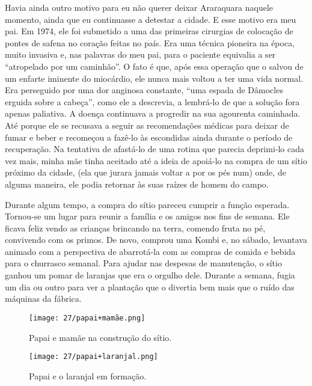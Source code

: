 Havia ainda outro motivo para eu não querer deixar Araraquara naquele momento, ainda que eu continuasse a detestar a cidade.
E esse motivo era  meu pai.
Em 1974, ele foi submetido a uma das primeiras cirurgias de colocação de pontes de safena no coração feitas no país.
Era uma técnica pioneira na época, muito invasiva e, nas palavras do meu pai, para o paciente equivalia a ser “atropelado por um caminhão”.
O fato é que, após essa operação que o salvou de um enfarte iminente do miocárdio, ele nunca mais voltou a ter uma vida normal.
Era perseguido por uma dor anginosa constante, “uma espada de Dâmocles erguida sobre a cabeça”, como ele a descrevia, a lembrá-lo de que a solução fora apenas paliativa.
A doença continuava a progredir na sua agourenta caminhada.
Até porque ele se recusava a seguir as recomendações médicas para deixar de fumar e beber e recomeçou a fazê-lo às escondidas ainda durante o período de recuperação.
 Na tentativa de afastá-lo de uma rotina que parecia deprimi-lo cada vez mais, minha mãe tinha aceitado até a ideia de apoiá-lo na compra de um sítio próximo da cidade, (ela que jurara jamais voltar a por os pés num) onde, de alguma maneira, ele podia retornar às suas raízes de homem do campo.

Durante algum tempo, a compra do sítio pareceu cumprir a função esperada.
Tornou-se um lugar para reunir a família e os amigos nos fins de semana.
Ele ficava feliz vendo as crianças brincando na terra, comendo fruta no pé, convivendo com os primos.
De novo, comprou uma Kombi e, no sábado, levantava animado com a perspectiva de abarrotá-la com as compras de comida e bebida para o churrasco semanal.
Para ajudar nas despesas de manutenção, o sítio ganhou um pomar de laranjas que era o orgulho dele.
 Durante a semana, fugia um dia ou outro para ver a plantação que o divertia bem mais que o ruído das máquinas da fábrica.

\begin{figure}
\centering
\texttt{[image: 27/papai+mamãe.png]}
\caption{Papai e mamãe na construção do sítio.}
\end{figure}

\begin{figure}
\centering
\texttt{[image: 27/papai+laranjal.png]}
\caption{Papai e o laranjal em formação.}
\end{figure}

